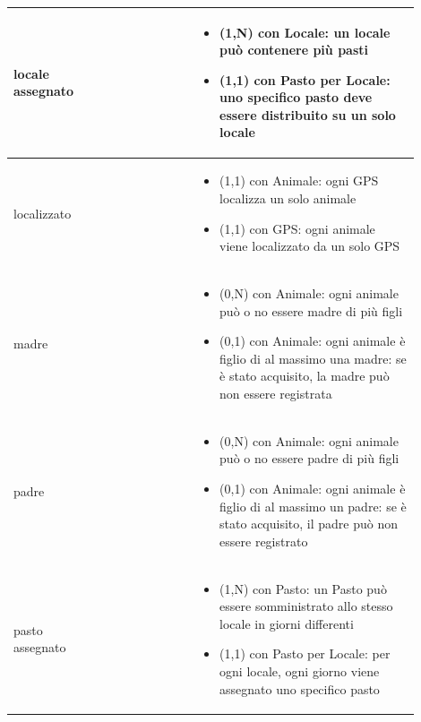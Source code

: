 \documentclass[12pt,a4paper]{article}
\begin{document}
\begin{center}
\begin{longtable}{|p{0.16\linewidth}|p{0.24\linewidth}|p{0.50\linewidth}|}
\hline
locale assegnato 				&  
					& \begin{itemize}
						\setlength{\itemindent}{-1em}
						\vspace{-25pt}
						\setlength\itemsep{-0.25em}
						\item (1,N) con Locale: un locale può contenere più pasti
						\item (1,1) con Pasto per Locale: uno specifico pasto deve essere distribuito su un solo locale
					\end{itemize}\\ 

\hline
localizzato				&   
					& \begin{itemize}
						\setlength{\itemindent}{-1em}
						\vspace{-25pt}
						\setlength\itemsep{-0.25em}
						\item (1,1) con Animale: ogni GPS localizza un solo animale
						\item (1,1) con GPS: ogni animale viene localizzato da un solo GPS
					\end{itemize}\\ 

\hline
madre				&  
					&\begin{itemize}
						\setlength{\itemindent}{-1em}
						\vspace{-25pt}
						\setlength\itemsep{-0.25em}
						\item (0,N) con Animale: ogni animale può o no essere madre di più figli
						\item (0,1) con Animale: ogni animale è figlio di al massimo una madre: se è stato acquisito, la madre può non essere registrata
					\end{itemize}\\ 

\hline
padre				&  
					&\begin{itemize}
						\setlength{\itemindent}{-1em}
						\vspace{-25pt}
						\setlength\itemsep{-0.25em}
						\item (0,N) con Animale: ogni animale può o no essere padre di più figli
						\item (0,1) con Animale: ogni animale è figlio di al massimo un padre: se è stato acquisito, il padre può non essere registrato
					\end{itemize}\\ 

\hline
pasto assegnato 				&  
					& \begin{itemize}
						\setlength{\itemindent}{-1em}
						\vspace{-25pt}
						\setlength\itemsep{-0.25em}
						\item (1,N) con Pasto: un Pasto può essere somministrato allo stesso locale in giorni differenti
						\item (1,1) con Pasto per Locale: per ogni locale, ogni giorno viene assegnato uno specifico pasto
					\end{itemize}\\ 


\end{longtable}
\end{center}
\end{document}
